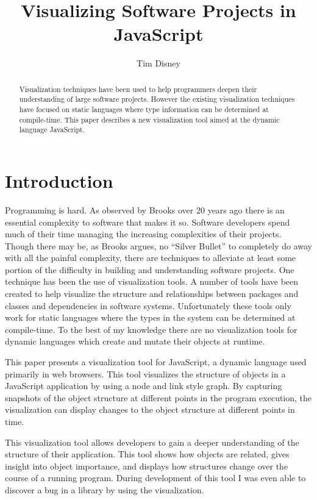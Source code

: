 \documentclass[]{article}
\begin{document}
\title{Visualizing Software Projects in JavaScript}
\author{Tim Disney}
\date{}

\maketitle

\lstset{showstringspaces=false}

\begin{abstract}
  Visualization techniques have been used to help programmers deepen their understanding of large software projects. However the existing visualization techniques have focused on static languages where type information can be determined at compile-time. This paper describes a new visualization tool aimed at the dynamic language JavaScript.
\end{abstract}

\section{Introduction}
\label{sec:introduction}
Programming is hard. As observed by Brooks \cite{brooks1987no} over 20 years ago there is an essential complexity to software that makes it so. Software developers spend much of their time managing the increasing complexities of their projects. Though there may be, as Brooks argues, no ``Silver Bullet'' to completely do away with all the painful complexity, there are techniques to alleviate at least some portion of the difficulty in building and understanding software projects. One technique has been the use of visualization tools. A number of tools have been created to help visualize the structure and relationships between packages and classes \cite{solidsx, haskellvis} and dependencies \cite{idea, stan4j} in software systems. Unfortunately these tools only work for static languages where the types in the system can be determined at compile-time. To the best of my knowledge there are no visualization tools for dynamic languages which create and mutate their objects at runtime.

This paper presents a visualization tool for JavaScript, a dynamic language used primarily in web browsers. This tool visualizes the structure of objects in a JavaScript application by using a node and link style graph. By capturing snapshots of the object structure at different points in the program execution, the visualization can display changes to the object structure at different points in time. 

This visualization tool allows developers to gain a deeper understanding of the structure of their application. This tool shows how objects are related, gives insight into object importance, and displays how structures change over the course of a running program. During development of this tool I was even able to discover a bug in a library by using the visualization.
\end{document}
